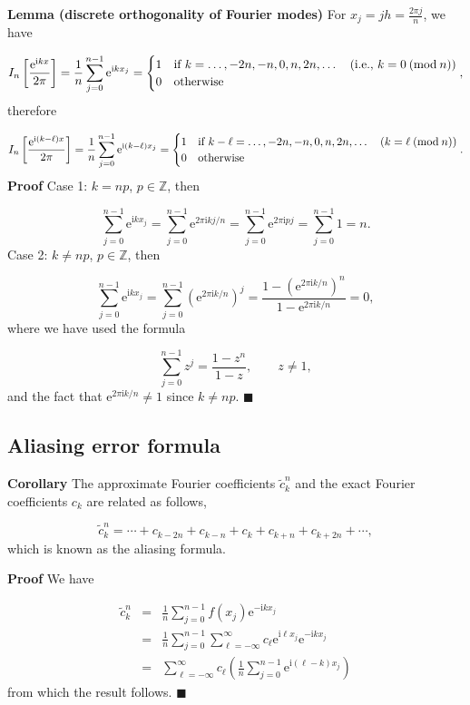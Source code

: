 \documentclass[12pt,a4paper]{article}
\begin{document}
\textbf{Lemma (discrete orthogonality of Fourier modes)} For $x_j = jh = \frac{2\pi j}{n}$, we have

\[
I_n\left[\frac{\mathrm{e}^{\mathrm{i}kx}}{2\pi}\right] = \frac{1}{n}\sum_{j = 0}^{n-1} \mathrm{e}^{\mathrm{i}kx_j} = \begin{cases}
1 & \text{if } k = \ldots, -2n, -n, 0, n, 2n, \ldots \quad (\text{i.e., }  k = 0\: ({\rm{mod }}\:n)) \\
0 & \text{otherwise}
\end{cases},
\]
therefore

\[
I_n\left[\frac{\mathrm{e}^{\mathrm{i}(k-\ell)x}}{2\pi}\right] = \frac{1}{n}\sum_{j = 0}^{n-1} \mathrm{e}^{\mathrm{i}(k-\ell)x_j} = \begin{cases}
1 & \text{if } k-\ell = \ldots, -2n, -n, 0, n, 2n, \ldots \quad  (k = \ell\: ({\rm{mod }}\:n)) \\
0 & \text{otherwise}
\end{cases}.
\]
\textbf{Proof} Case 1: $k = np$, $p \in \mathbb{Z}$, then

\[
\sum_{j = 0}^{n-1} \mathrm{e}^{\mathrm{i}kx_j} = \sum_{j = 0}^{n-1} \mathrm{e}^{2\pi\mathrm{i}kj/n} = \sum_{j = 0}^{n-1} \mathrm{e}^{2\pi\mathrm{i}pj} = \sum_{j = 0}^{n-1} 1 = n.
\]
Case 2: $k \neq np$, $p \in \mathbb{Z}$, then

\[
\sum_{j = 0}^{n-1} \mathrm{e}^{\mathrm{i}kx_j} = \sum_{j = 0}^{n-1} \left(\mathrm{e}^{2\pi\mathrm{i}k/n}\right)^{j} = \frac{1-\left(\mathrm{e}^{2\pi\mathrm{i}k/n}\right)^{n}}{1-\mathrm{e}^{2\pi\mathrm{i}k/n}} = 0,
\]
where we have used the formula

\[
\sum_{j = 0}^{n-1} z^{j} = \frac{1-z^n}{1-z},\qquad z \neq 1,
\]
and the fact that $\mathrm{e}^{2\pi\mathrm{i}k/n} \neq 1$ since $k \neq np$.  $\blacksquare$

\subsection{Aliasing error formula}
\textbf{Corollary} The approximate Fourier coefficients $\tilde{c}^n_k$ and the exact Fourier coefficients $c_k$ are related as follows,

\[
\tilde{c}^n_k = \cdots + c_{k-2n} + c_{k-n} +  c_k +  c_{k+n} + c_{k+2n} + \cdots,
\]
which is known as the aliasing formula.

\textbf{Proof}  We have


\begin{eqnarray*}
  \tilde{c}^n_k   &=&\frac{1}{n}\sum_{j = 0}^{n-1} f(x_j)\mathrm{e}^{-\mathrm{i}kx_j}   \\
    & = & \frac{1}{n}\sum_{j = 0}^{n-1} \sum_{\ell=-\infty}^{\infty} c_{\ell}\mathrm{e}^{\mathrm{i}\ell x_j} \mathrm{e}^{-\mathrm{i}kx_j}  \\
    &=& \sum_{\ell=-\infty}^{\infty}c_{\ell}\left(\frac{1}{n}\sum_{j = 0}^{n-1} \mathrm{e}^{\mathrm{i}(\ell-k) x_j}   \right)
\end{eqnarray*}
from which the result follows.   $\blacksquare$
\end{document}
